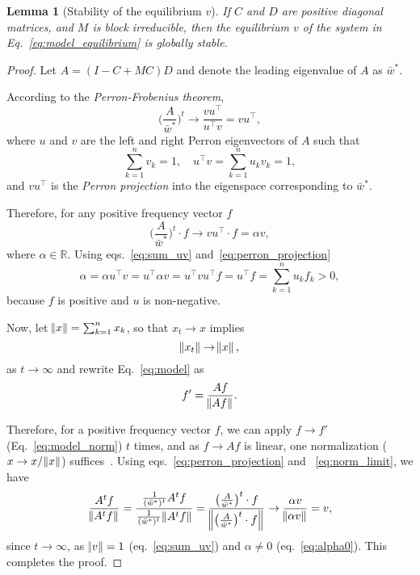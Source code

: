 \documentclass[9pt, a4paper, twocolumn]{extarticle}
\newcommand*{\tr}{^\intercal}
\newcommand{\goesto}{\rightarrow}
\newtheorem{lemma}{Lemma}
\begin{document}
\begin{lemma}[Stability of the equilibrium $v$]
If $C$ and $D$ are positive diagonal matrices, and $M$ is block irreducible, 
then the equilibrium $v$ of the system in Eq.~\ref{eq:model_equilibrium} is globally stable.
\end{lemma}

\begin{proof}
Let $A=(I-C+MC)D$ and denote the leading eigenvalue of $A$ as $\bar{w}^*$.

According to the \emph{Perron-Frobenius theorem}, 
\begin{equation}
\bigg(\frac{A}{\bar{w}^*}\bigg)^t \goesto \frac{v u\tr}{u\tr v} = v u\tr,
\end{equation}
where $u$ and $v$ are the left and right Perron eigenvectors of $A$ such that 
\begin{equation}
\sum_{k=1}^{n}{v_k}=1, \quad
u\tr v=\sum_{k=1}^{n}{u_k v_k}=1,
\label{eq:sum_uv}
\end{equation}
and $v u\tr$ is the \emph{Perron projection} into the eigenspace corresponding to $\bar{w}^*$.

Therefore, for any positive frequency vector $f$
\begin{equation}
\bigg(\frac{A}{\bar{w}^*}\bigg)^t \cdot f \goesto v u\tr \cdot f = \alpha v,
\label{eq:perron_projection}
\end{equation}
where $\alpha \in \mathbb{R}$.
Using eqs.~\ref{eq:sum_uv} and~\ref{eq:perron_projection}
\begin{equation}
\alpha = \alpha u\tr v = u\tr \alpha v = u\tr v u\tr f = u\tr f = \sum_{k=1}^{n}{u_k f_k} > 0,
\label{eq:alpha0}
\end{equation}
because $f$ is positive and $u$ is non-negative.

Now, let $\norm{x} = \sum_{k=1}^{n}{x_k}$, so that $x_t \goesto x$ implies
\begin{equation}
\norm{x_t} \goesto \norm{x},
\label{eq:norm_limit}
\end{equation}
as $t \goesto \infty$ and rewrite Eq.~\ref{eq:model} as 
\begin{equation}
f' = \frac{A f}{\norm{A f}}. 
\label{eq:model_norm}
\end{equation}

Therefore, for a positive frequency vector $f$, we can apply $f \goesto f'$ (Eq.~\ref{eq:model_norm}) $t$ times, 
and as $f \goesto Af$ is linear, one normalization ($x \goesto x/\norm{x}$) suffices~\citep[see][Appendix~A]{Wakano2004}.
Using eqs.~\ref{eq:perron_projection} and ~\ref{eq:norm_limit}, we have
\begin{multline}
\frac{A^t f}{\norm{A^t f}} = 
\frac{\frac{1}{(\bar{w}^*)^t} A^t f}{\frac{1}{(\bar{w}^*)^t} \norm{A^t f}} = 
\frac{\big(\frac{A}{\bar{w}^*}\big)^t \cdot f }{ \norm{ \big(\frac{A}{\bar{w}^*}\big)^t \cdot f }} \goesto
\frac{\alpha v}{\norm{\alpha v}} = v,
\end{multline}
since $t \goesto \infty$, as $\norm{v}=1$ (eq.~\ref{eq:sum_uv}) and $\alpha \ne 0$ (eq.~\ref{eq:alpha0}).
This completes the proof.
\end{proof}
\end{document}
